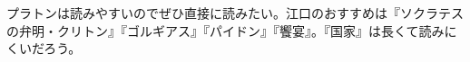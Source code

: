 \documentclass[uplatex]{bxjsarticle}
\begin{document}
プラトンは読みやすいのでぜひ直接に読みたい。江口のおすすめは『ソクラテスの弁明・クリトン』『ゴルギアス』『パイドン』『饗宴』。『国家』は長くて読みにくいだろう。



%
%
%




\ifx\mybook\undefined


\end{document}
